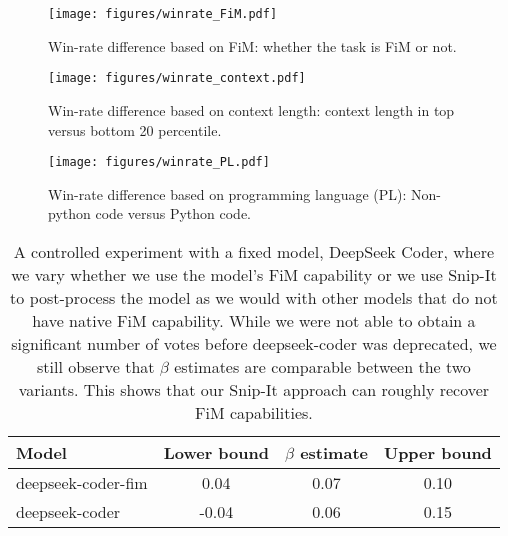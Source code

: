 \begin{figure}[h]
    \centering
    \texttt{[image: figures/winrate\_FiM.pdf]}
    \caption{Win-rate difference based on FiM: whether the task is FiM or not.}
    \label{fig:winrate_FiM}
\end{figure}


\begin{figure}[h]
    \centering
    \texttt{[image: figures/winrate\_context.pdf]}
    \caption{Win-rate difference based on context length: context length in top versus bottom 20 percentile.}
    \label{fig:winrate_context}
\end{figure}



\begin{figure}[h]
    \centering
    \texttt{[image: figures/winrate\_PL.pdf]}
    \caption{Win-rate difference based on programming language (PL): Non-python code versus Python code.}
    \label{fig:winrate_PL}
\end{figure}






\begin{table}[h!]
\centering
\caption{A controlled experiment with a fixed model, DeepSeek Coder, where we vary whether we use the model's FiM capability or we use Snip-It to post-process the model as we would with other models that do not have native FiM capability. While we were not able to obtain a significant number of votes before deepseek-coder was deprecated, we still observe that $\beta$ estimates are comparable between the two variants. This shows that our Snip-It approach can roughly recover FiM capabilities. }
\begin{tabular}{lccc}
\hline
\textbf{Model} & \textbf{Lower bound} & \textbf{$\beta$ estimate} & \textbf{Upper bound} \\ \hline
deepseek-coder-fim         & 0.04  & 0.07  & 0.10  \\
deepseek-coder & -0.04  &  0.06 &  0.15  \\ \hline
\end{tabular}
\label{tab:fim}
\end{table}

